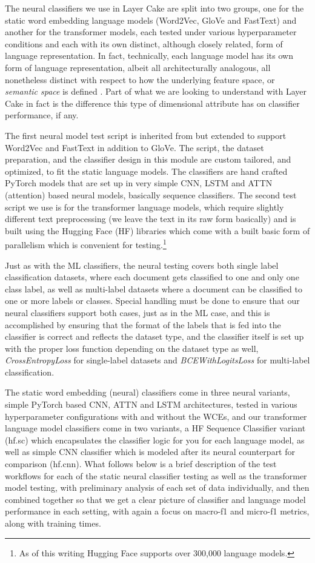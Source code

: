 \documentclass[final]{clv2025-revised}
\begin{document}
The neural classifiers we use in Layer Cake are split into two groups, one for the static word embedding language models (Word2Vec, GloVe and FastText) and another for the transformer models, each tested under various hyperparameter conditions and each with its own distinct, although closely related, form of language representation. In fact, technically, each language model has its own form of language representation, albeit all architecturally analogous, all nonetheless distinct with respect to how the underlying feature space, or \textit{semantic space} is defined \cite{worth}. Part of what we are looking to understand with Layer Cake in fact is the difference this type of dimensional attribute has on classifier performance, if any.

The first neural model test script is inherited from \cite{moreo2021} but extended to support Word2Vec and FastText in addition to GloVe. The script, the dataset preparation, and the classifier design in this module are custom tailored, and optimized, to fit the static language models. The classifiers are hand crafted PyTorch models that are set up in very simple CNN, LSTM and ATTN (attention) based neural models, basically sequence classifiers. The second test script we use is for the transformer language models, which require slightly different text preprocessing (we leave the text in its raw form basically) and is built using the Hugging Face (HF) libraries which come with a built basic form of parallelism which is convenient for testing.\footnote{As of this writing Hugging Face supports over 300,000 language models.}  

Just as with the ML classifiers, the neural testing covers both single label classification datasets, where each document gets classified to one and only one class label, as well as multi-label datasets where a document can be classified to one or more labels or classes. Special handling must be done to ensure that our neural classifiers support both cases, just as in the ML case, and this is accomplished by ensuring that the format of the labels that is fed into the classifier is correct and reflects the dataset type, and the classifier itself is set up with the proper loss function depending on the dataset type as well, \textit{CrossEntropyLoss} for single-label datasets and \textit{BCEWithLogitsLoss} for multi-label classification.

The static word embedding (neural) classifiers come in three neural variants, simple PyTorch based CNN, ATTN and LSTM architectures, tested in various hyperparameter configurations with and without the WCEs, and our transformer language model classifiers come in two variants, a HF Sequence Classifier variant (hf.sc) which encapsulates the classifier logic for you for each language model, as well as simple CNN classifier which is modeled after its neural counterpart for comparison (hf.cnn). What follows below is a brief description of the test workflows for each of the static neural classifier testing as well as the transformer model testing, with preliminary analysis of each set of data individually, and then combined together so that we get a clear picture of classifier and language model performance in each setting, with again a focus on macro-f1 and micro-f1 metrics, along with training times. 
\end{document}
